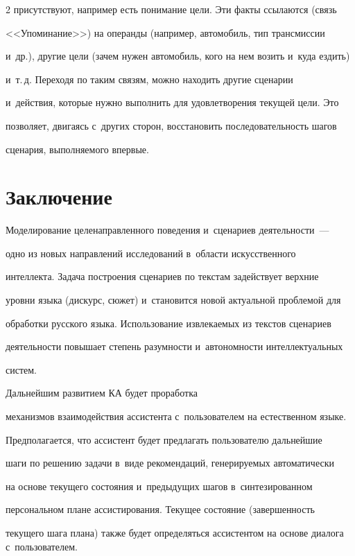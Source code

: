 \begin{multicols}{2}
присутствуют, например есть понимание цели. Эти факты ссылаются (связь 

<<Упоминание>>) на операнды (например, автомобиль, тип трансмиссии 

и~др.), другие цели (зачем нужен автомобиль, кого на нем возить и~куда ездить) 

и~т.\,д. Переходя по таким связям, можно находить другие сценарии 

и~действия, которые нужно выполнить для удовле\-тво\-ре\-ния текущей цели. Это 

позволяет, двигаясь с~других сторон, восстановить по\-сле\-до\-ва\-тель\-ность шагов 

сценария, выполняемого впервые.



\section{Заключение}



  Моделирование целенаправленного поведения и~сценариев де\-я\-тель\-ности~--- 

одно из новых на\-прав\-ле\-ний исследований в~об\-ласти искусственного 

интеллекта. Задача по\-стро\-ения сценариев по текстам задействует верхние 

уровни языка (дискурс, сюжет) и~становится новой актуальной проблемой для 

обработки русского языка. Использование извле\-ка\-емых из текстов сценариев 

де\-я\-тель\-ности повышает степень ра\-зум\-ности и~ав\-то\-ном\-ности интеллектуальных 

систем.

  

  Дальнейшим развитием КА будет проработка 

механизмов взаимодействия ас\-сис\-тен\-та с~пользователем на естественном языке. 

Предполагается, что ас\-сис\-тент будет предлагать пользователю дальнейшие 

шаги по решению задачи в~виде рекомендаций, генерируемых автоматически 

на основе текущего со\-сто\-яния и~предыдущих шагов в~синтезированном 

персональном плане ас\-сис\-ти\-ро\-ва\-ния. Текущее состояние (за\-вер\-шен\-ность 

текущего шага плана) также будет определяться ассистентом на основе диалога с~пользователем.


\end{multicols}
